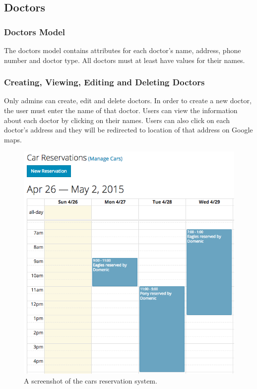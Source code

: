 \documentclass{sig-alternate}
\begin{document}
\subsection{Doctors}

\subsubsection{Doctors Model}
The doctors model contains attributes for each doctor’s name, address, phone number and doctor type. All doctors must at least have values for their names. 

\subsubsection{Creating, Viewing, Editing and Deleting Doctors}
Only admins can create, edit and delete doctors. In order to create a new doctor, the user must enter the name of that doctor. Users can view the information about each doctor by clicking on their names. Users can also click on each doctor’s address and they will be redirected to location of that address on Google maps. 

\begin{figure}
\includegraphics[scale=0.4]{Cars}
\caption{A screenshot of the cars reservation system.}
\end{figure}
\end{document}
